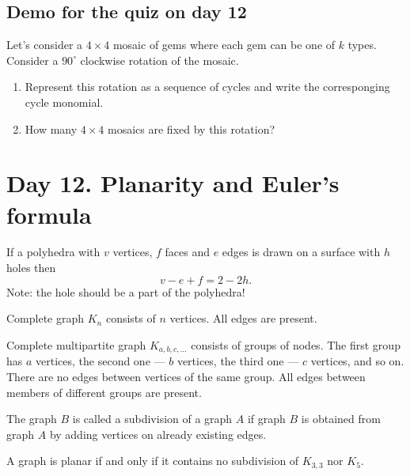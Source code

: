 \documentclass[12pt]{article}
\begin{document}
\subsection*{Demo for the quiz on day 12}

Let's consider a $4 \times 4$ mosaic of gems where each gem can be one of $k$ types. 
Consider a $90^{\circ}$ clockwise rotation of the mosaic.
\begin{enumerate}
    \item Represent this rotation as a sequence of cycles and write the corresponging cycle monomial. 
    \item How many $4\times 4$ mosaics are fixed by this rotation?
\end{enumerate}


\section{Day 12. Planarity and Euler's formula}

\begin{theorem}
    If a polyhedra with $v$ vertices, $f$ faces and $e$ edges is drawn on a surface with $h$ holes then
    \[
    v - e + f = 2 - 2h.
    \]
    Note: the hole should be a part of the polyhedra!
\end{theorem}

\begin{definition}
    Complete graph $K_n$ consists of $n$ vertices. All edges are present.
\end{definition}

\begin{definition}
    Complete multipartite graph $K_{a, b, c, \dots}$ consists of groups of nodes.
    The first group has $a$ vertices, the second one — $b$ vertices, the third one — $c$ vertices, and so on.
    There are no edges between vertices of the same group. 
    All edges between members of different groups are present.
\end{definition}

\begin{definition}
    The graph $B$ is called a subdivision of a graph $A$ if graph $B$ is obtained from graph $A$ by adding vertices on already existing edges. 
\end{definition}

\begin{theorem}
    A graph is planar if and only if it contains no subdivision of $K_{3,3}$ nor $K_5$.    
\end{theorem}
\end{document}
